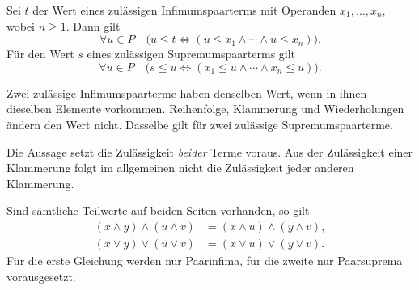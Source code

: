 \begin{theorem}
\label{b14guide:thm:term}
Sei $t$ der Wert eines zulässigen Infimumspaarterms mit
Operanden $x_1,\ldots,x_n$, wobei $n\geq1$. Dann gilt
\[
 \forall u\in P\quad
 \bigl(u\leq t\Longleftrightarrow
       (u\leq x_1\land\cdots\land u\leq x_n)\bigr).
\]
Für den Wert $s$ eines zulässigen Supremumspaarterms gilt
\[
 \forall u\in P\quad
 \bigl(s\leq u\Longleftrightarrow
       (x_1\leq u\land\cdots\land x_n\leq u)\bigr).
\]
\end{theorem}

\begin{theorem}
\label{b14guide:thm:term-equality}
Zwei zulässige Infimumspaarterme haben denselben Wert,
wenn in ihnen dieselben Elemente vorkommen. Reihenfolge,
Klammerung und Wiederholungen ändern den Wert nicht.
Dasselbe gilt für zwei zulässige Supremumspaarterme.

Die Aussage setzt die Zulässigkeit \emph{beider} Terme voraus.
Aus der Zulässigkeit einer Klammerung folgt im allgemeinen
nicht die Zulässigkeit jeder anderen Klammerung.
\end{theorem}

\begin{theorem}
\label{b14guide:thm:four}
Sind sämtliche Teilwerte auf beiden Seiten vorhanden, so gilt
\[
\begin{aligned}
 (x\wedge y)\wedge(u\wedge v)
   &=(x\wedge u)\wedge(y\wedge v),\\
 (x\vee y)\vee(u\vee v)
   &=(x\vee u)\vee(y\vee v).
\end{aligned}
\]
Für die erste Gleichung werden nur Paarinfima, für die zweite
nur Paarsuprema vorausgesetzt.
\end{theorem}